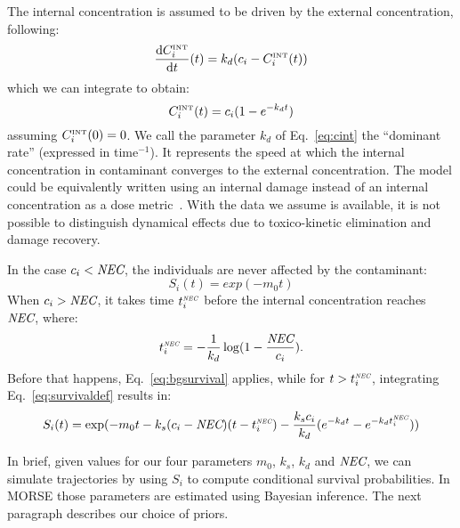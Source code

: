 \documentclass{article}
\begin{document}
\noindent The internal concentration is assumed to be driven by the external
concentration, following:
$$
\frac{\mathop{\mathrm{d}\!} C^{\mbox{\tiny INT}}_i}{\mathop{\mathrm{d}\!} t}(t) = k_d (c_i - C^{\mbox{\tiny INT}}_i(t))
$$
which we can integrate to obtain:
\begin{equation}
\label{eq:cint}
C^{\mbox{\tiny INT}}_i(t) = c_i(1 - e^{-k_d t})
\end{equation}
assuming $C^{\mbox{\tiny INT}}_i(0) = 0$. We call the parameter $k_d$ of
Eq.~\ref{eq:cint} the ``dominant rate'' (expressed in time$^{-1}$). It
represents the speed at which the internal concentration in
contaminant converges to the external concentration. The model could
be equivalently written using an internal damage instead of an
internal concentration as a dose metric~\cite{jager2011}. With the
data we assume is available, it is not possible to distinguish
dynamical effects due to toxico-kinetic elimination and damage
recovery.

\bigskip

\noindent In the case $c_i <
\mbox{\it NEC}$, the individuals are never affected by the contaminant:
\begin{equation}
  \label{eq:bgsurvival}
  S_i(t) = exp( - m_0 t )
\end{equation}
When $c_i > \mbox{\it NEC}$, it takes time $t^{\tiny \mbox{\it NEC}}_i$ before the internal
concentration reaches $\mbox{\it NEC}$, where:
$$
t^{\tiny \mbox{\it NEC}}_i = - \frac{1}{k_d} \log (1 - \frac{\mbox{\it NEC}}{c_i}).
$$
Before that happens, Eq.~\ref{eq:bgsurvival} applies, while for $t >
t^{\tiny \mbox{\it NEC}}_i$, integrating Eq.~\ref{eq:survivaldef} results in:
$$
S_i(t) = \exp(- m_0 t - k_s(c_i - \mbox{\it NEC})(t - t^{\tiny \mbox{\it NEC}}_i) - \frac{k_s c_i}{k_d}(e^{- k_d t} - e^{-k_d t^{\tiny \mbox{\it NEC}}_i}))
$$

In brief, given values for our four parameters $m_0$, $k_s$, $k_d$ and
$\mbox{\it NEC}$, we can simulate trajectories by using $S_i$ to compute
conditional survival probabilities. In MORSE those parameters are
estimated using Bayesian inference. The next paragraph describes our
choice of priors.
\end{document}
